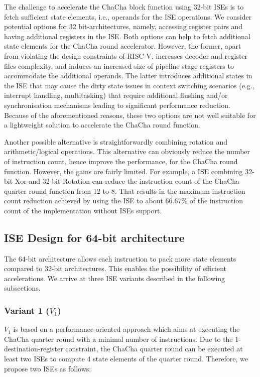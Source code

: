 The challenge to accelerate the ChaCha block function using 32-bit ISEs is to fetch sufficient state elements, i.e., operands for the ISE operations.
We consider potential options for 32 bit-architectures, namely, accessing register pairs and having additional registers in the ISE.
Both options can help to fetch additional state elements for the ChaCha round accelerator. 
However, the former, apart from violating the design constraints of RISC-V, 
increases decoder and register files complexity, and 
induces an increased size of pipeline stage registers to accommodate the additional operands.
The latter introduces additional states in the ISE that may cause the dirty state issues in context switching scenarios (e.g., interrupt handling, multitasking) that require additional flushing and/or synchronisation mechanisms leading to significant performance reduction.
Because of the aforementioned reasons, these two options are not well suitable for a lightweight solution to accelerate the ChaCha round function.

Another possible alternative is straightforwardly combining rotation and arithmetic/logical operations. 
This alternative can obviously reduce the number of instruction count, hence improve the performance, for the ChaCha round function.
However, the gains are fairly limited. 
For example, a ISE combining 32-bit Xor and 32-bit Rotation can reduce the instruction count of the ChaCha quarter round function from 
12 to 8. 
That results in the maximum instruction count reduction achieved by using the ISE to about 66.67\% of the instruction count of the implementation without ISEs support.

\subsection{ISE Design for 64-bit architecture}
The 64-bit architecture allows each instruction to pack more state elements compared to 32-bit architectures. 
This enables the possibility of efficient accelerations.
We arrive at three ISE variants described in the following subsections. 

\subsubsection{Variant 1 ($V_1$)}
$V_1$ is based on a performance-oriented approach which aims at executing the ChaCha quarter round with a minimal number of instructions.
Due to the 1-destination-register constraint, the ChaCha quarter round can be executed at least two ISEs to compute 4 state elements of the quarter round.
Therefore, we propose two ISEs as follows:

